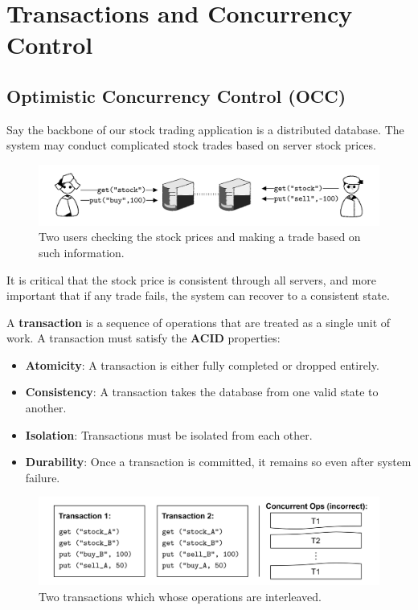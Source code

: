 \newpage 

\section{Transactions and Concurrency Control}
\subsection{Optimistic Concurrency Control (OCC)}

\noindent
Say the backbone of our stock trading application is a 
distributed database. The system may conduct complicated
stock trades based on server stock prices.
\begin{figure}[h]
    \centering
    \includegraphics[width=\textwidth]{Sections/trans/stock.png}
    \caption{Two users checking the stock prices and making a trade based on such information.}
    \label{fig:stock_trading}
\end{figure}

\noindent
It is critical that the stock price is consistent through all servers, and 
more important that if any trade fails, the system can recover to a consistent state.

\begin{Def}[Transaction]

    A \textbf{transaction} is a sequence of operations that are treated as a single unit of work.
    A transaction must satisfy the \textbf{ACID} properties:
    \begin{itemize}
        \item \textbf{Atomicity}: A transaction is either fully completed or dropped entirely.
        \item \textbf{Consistency}:  A transaction takes the database from one valid state to another.
        \item \textbf{Isolation}: Transactions must be isolated from each other.
        \item \textbf{Durability}: Once a transaction is committed, it remains so even after system failure.
    \end{itemize}
\end{Def}

\vspace{-0.5em}
\begin{figure}[h]
    \centering 
    \includegraphics[width=\textwidth]{Sections/trans/stock_2.png}
    \caption{Two transactions which whose operations are interleaved.}
    \label{fig:stock_trading}
\end{figure}


